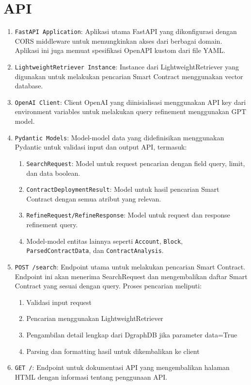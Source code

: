 \chapter{API}
\label{appendix:api}

\begin{enumerate}
	\item \texttt{FastAPI Application}: Aplikasi utama FastAPI yang dikonfigurasi dengan CORS middleware untuk memungkinkan akses dari berbagai domain. Aplikasi ini juga memuat spesifikasi OpenAPI kustom dari file YAML.
	\item \texttt{LightweightRetriever Instance}: Instance dari LightweightRetriever yang digunakan untuk melakukan pencarian Smart Contract menggunakan vector database.
	\item \texttt{OpenAI Client}: Client OpenAI yang diinisialisasi menggunakan API key dari environment variables untuk melakukan query refinement menggunakan GPT model.
	\item \texttt{Pydantic Models}: Model-model data yang didefinisikan menggunakan Pydantic untuk validasi input dan output API, termasuk:
	      \begin{enumerate}
		      \item \texttt{SearchRequest}: Model untuk request pencarian dengan field query, limit, dan data boolean.
		      \item \texttt{ContractDeploymentResult}: Model untuk hasil pencarian Smart Contract dengan semua atribut yang relevan.
		      \item \texttt{RefineRequest/RefineResponse}: Model untuk request dan response refinement query.
		      \item Model-model entitas lainnya seperti \texttt{Account}, \texttt{Block}, \\\texttt{ParsedContractData}, dan \texttt{ContractAnalysis}.
	      \end{enumerate}
	\item \texttt{POST /search}: Endpoint utama untuk melakukan pencarian Smart Contract. Endpoint ini akan menerima SearchRequest dan mengembalikan daftar Smart Contract yang sesuai dengan query. Proses pencarian meliputi:
	      \begin{enumerate}
		      \item Validasi input request
		      \item Pencarian menggunakan LightweightRetriever
		      \item Pengambilan detail lengkap dari DgraphDB jika parameter data=True
		      \item Parsing dan formatting hasil untuk dikembalikan ke client
	      \end{enumerate}
	\item \texttt{GET /}: Endpoint untuk dokumentasi API yang mengembalikan halaman HTML dengan informasi tentang penggunaan API.
\end{enumerate}

